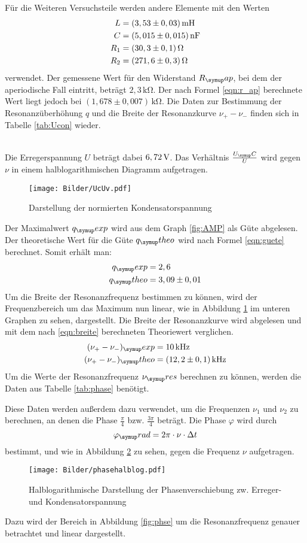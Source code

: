Für die Weiteren Versuchsteile werden andere Elemente mit den Werten
\begin{align*}
  L &= (3,53 \pm 0,03) \,\si{\milli\henry} \\
  C &= (5,015 \pm 0,015) \,\si{\nano\farad} \\
  R_1 &= (30,3 \pm 0,1) \Ohm \\
  R_2 &= (271,6 \pm 0,3) \Ohm
\end{align*}
verwendet.
Der gemessene Wert für den Widerstand $R_\su{ap}$, bei dem der aperiodische Fall
eintritt, beträgt $2,3\,\si{\kilo\ohm}$. Der nach Formel \eqref{eqn:r_ap}
berechnete Wert liegt jedoch bei $(1,678 \pm 0,007)\,\si{\kilo\ohm}$.
Die Daten zur Bestimmung der Resonanzüberhöhung $q$ und die Breite der
Resonanzkurve $\nu_+ - \nu_-$ finden sich in Tabelle \ref{tab:Ucon} wieder.

\\
Die Erregerspannung $U$ beträgt dabei $6,72 \,\si{\volt}$.
Das Verhältnis $\frac{U_\su{C}}{U}$ wird gegen $\nu$ in einem halblogarithmischen
Diagramm aufgetragen.
\begin{figure}[h]
  \centering
  \texttt{[image: Bilder/UcUv.pdf]}
  \caption{Darstellung der normierten Kondensatorspannung}
  \label{fig:UcUv}
\end{figure}
Der Maximalwert $q_\su{exp}$ wird aus dem Graph \ref{fig:AMP} als Güte abgelesen. Der
theoretische Wert für die Güte $q_\su{theo}$ wird nach Formel \eqref{eqn:guete} berechnet.
Somit erhält man:
\begin{align*}
  q_\su{exp} &= 2,6 \\
  q_\su{theo} &= 3,09 \pm 0,01
\end{align*}
Um die Breite der Resonanzfrequenz bestimmen zu können, wird der Frequenzbereich
um das Maximum nun linear, wie in Abbildung \ref{fig:UcUv} im unteren Graphen
zu sehen, dargestellt. Die Breite der Resonanzkurve wird abgelesen und mit dem
nach \eqref{eqn:breite} berechneten Theoriewert verglichen.
\begin{align*}
  (\nu_+ - \nu_-)_\su{exp} &= 10\kHz \\
  (\nu_+ - \nu_-)_\su{theo}&= (12,2 \pm 0,1)\kHz
\end{align*}
Um die Werte der Resonanzfrequenz $\nu_\su{res}$ berechnen zu können, werden
die Daten aus Tabelle \ref{tab:phase} benötigt.

Diese Daten werden außerdem dazu verwendet, um die Frequenzen $\nu_1$ und
$\nu_2$ zu berechnen, an denen die Phase $\frac{\pi}{4}$ bzw.
$\frac{3\pi}{4}$ beträgt. Die Phase $\varphi$ wird durch
\begin{equation}
  \varphi_\su{rad} = 2\pi \cdot \nu \cdot \Delta t
\end{equation}
bestimmt, und wie in Abbildung \ref{fig:philog}
zu sehen, gegen die Frequenz $\nu$ aufgetragen.
\newpage
\begin{figure}[!h]
  \centering
  \texttt{[image: Bilder/phasehalblog.pdf]}
  \caption{Halblogarithmische Darstellung der Phasenverschiebung zw. Erreger-
  und Kondensatorspannung}
  \label{fig:philog}
\end{figure}
Dazu wird der Bereich in Abbildung \ref{fig:phse} um die Resonanzfrequenz genauer
betrachtet und linear dargestellt.

